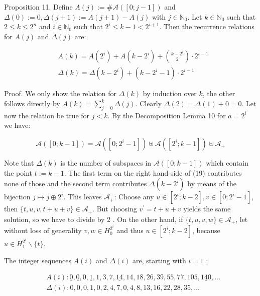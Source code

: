 \documentclass[10pt]{article}
\begin{document}
Proposition 11. Define $A(j):=\# \mathcal{A}([0 ; j-1])$ and $\Delta(0):=0, \Delta(j+1):= A(j+1)-A(j)$ with $j \in \mathbb{N}_{0}$. Let $k \in \mathbb{N}_{0}$ such that $2 \leq k \leq 2^{n}$ and $i \in \mathbb{N}_{0}$ such that $2^{i} \leq k-1<2^{i+1}$. Then the recurrence relations for $A(j)$ and $\Delta(j)$ are:


\begin{align*}
& A(k)=A\left(2^{i}\right)+A\left(k-2^{i}\right)+\binom{k-2^{i}}{2} \cdot 2^{i-1}  \tag{17}\\
& \Delta(k)=\Delta\left(k-2^{i}\right)+\left(k-2^{i}-1\right) \cdot 2^{i-1} \tag{18}
\end{align*}


Proof. We only show the relation for $\Delta(k)$ by induction over $k$, the other follows directly by $A(k)=\sum_{j=0}^{k} \Delta(j)$. Clearly $\Delta(2)=\Delta(1)+0=0$. Let now the relation be true for $j<k$. By the Decomposition Lemma 10 for $a=2^{i}$ we have:


\begin{equation*}
\mathcal{A}([0 ; k-1])=\mathcal{A}\left(\left[0 ; 2^{i}-1\right]\right) \uplus \mathcal{A}\left(\left[2^{i} ; k-1\right]\right) \uplus \mathcal{A}_{+} \tag{19}
\end{equation*}


Note that $\Delta(k)$ is the number of subspaces in $\mathcal{A}([0 ; k-1])$ which contain the point $t:=k-1$. The first term on the right hand side of (19) contributes none of those and the second term contributes $\Delta\left(k-2^{i}\right)$ by means of the bijection $j \mapsto j \oplus 2^{i}$. This leaves $\mathcal{A}_{+}$: Choose any $u \in\left[2^{i} ; k-2\right], v \in\left[0 ; 2^{i}-1\right]$, then $\{t, u, v, t+u+v\} \in \mathcal{A}_{+}$. But choosing $v^{\prime}=t+u+v$ yields the same solution, so we have to divide by 2 . On the other hand, if $\{t, u, v, w\} \in \mathcal{A}_{+}$, let without loss of generality $v, w \in H_{0}^{2^{i}}$ and thus $u \in\left[2^{i} ; k-2\right]$, because $u \in H_{1}^{2^{i}} \backslash\{t\}$.

The integer sequences $A(i)$ and $\Delta(i)$ are, starting with $i=1$ :


\begin{align*}
& A(i): \underline{0}, \underline{0}, 0, \underline{1}, 1,3,7, \underline{14}, 14,18,26,39,55,77,105, \underline{140}, \ldots  \tag{20}\\
& \Delta(i): 0,0,0,1,0,2,4,7,0,4,8,13,16,22,28,35, \ldots \tag{21}
\end{align*}
\end{document}
